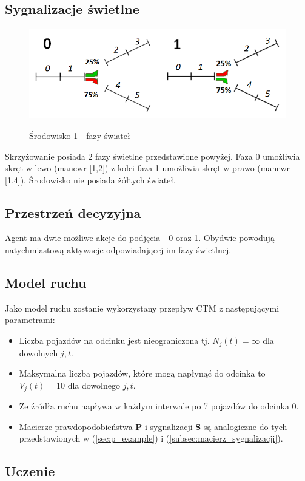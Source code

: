\documentclass[12pt]{book}
\theoremstyle{plain}
\newcommand{\myref}[1]{(\ref{#1})}
\begin{document}
\subsection{Sygnalizacje świetlne}	
\begin{figure}[H]
	\centering
	\includegraphics[width=17cm]{images/env_11_fazy_procenty_no_yellow_italic2}
	\label{fig:env_11_fazy}
	\caption{Środowisko 1 - fazy świateł}
\end{figure}\noindent
Skrzyżowanie posiada 2 fazy świetlne przedstawione powyżej. Faza 0 umożliwia skręt w lewo (manewr [1,2]) z kolei faza 1 umożliwia skręt w prawo (manewr [1,4]). Środowisko nie posiada żółtych świateł.

\subsection{Przestrzeń decyzyjna}
Agent ma dwie możliwe akcje do podjęcia - 0 oraz 1. Obydwie powodują natychmiastową aktywacje odpowiadającej im fazy świetlnej.

\subsection{Model ruchu}
Jako model ruchu zostanie wykorzystany przepływ CTM z następującymi parametrami:
\begin{itemize}
	\item Liczba pojazdów na odcinku jest nieograniczona tj. $N_j(t)=\infty$ dla dowolnych $j,t$.
	\item Maksymalna liczba pojazdów, które mogą napłynąć do odcinka to $V_j(t)=10$ dla dowolnego $j,t$.
	\item Ze źródła ruchu napływa w każdym interwale po 7 pojazdów do odcinka 0.
	\item Macierze prawdopodobieństwa $\textbf{P}$ i sygnalizacji $\textbf{S}$ są analogiczne do tych przedstawionych w \myref{sec:p_example} i \myref{subsec:macierz_sygnalizacji}.
\end{itemize}

\subsection{Uczenie}
\end{document}
